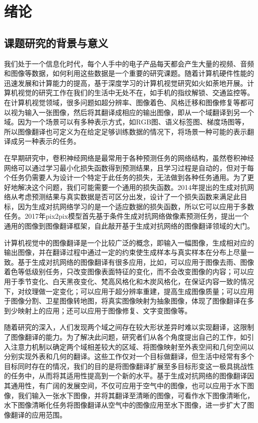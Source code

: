\chapter{绪论}

\section{课题研究的背景与意义}
我们处于一个信息化时代，每个人手中的电子产品每天都会产生大量的视频、音频和图像等数据，如何利用这些数据是一个重要的研究课题。随着计算机硬件性能的迅速发展和计算能力的提高，基于深度学习的计算机视觉研究如火如荼地开展。计算机视觉的研究工作在我们的生活中无处不在，如手机的指纹解锁、交通监控等。在计算机视觉领域，很多问题如超分辨率、图像着色、风格迁移和图像修复等都可以视为输入一张图像，然后将其翻译成相应的输出图像，即从一个域翻译到另一个域。因为一个场景可以有多种表示方式，如RGB图、语义标签图、梯度场图等，所以图像翻译也可定义为在给定足够训练数据的情况下，将场景一种可能的表示翻译成另一种表示的任务。

在早期研究中，卷积神经网络是最常用于各种预测任务的网络结构，虽然卷积神经网络可以通过学习最小化损失函数得到预测结果，且学习过程是自动的，但对于每个任务仍需要人为设计一个特定于此任务的损失，无法做到各种任务通用。为了更好地解决这个问题，我们可能需要一个通用的损失函数。2014年提出的生成对抗网络\cite{goodfellow2014generative}从考虑预测结果与真实数据是否可区分出发，设计了一个损失函数来满足此目标，因为生成对抗网络学习的是一个适应数据的损失函数，所以它可以应用于多数任务。2017年pix2pix\cite{isola2017image}模型首先基于条件生成对抗网络做像素预测任务，提出一个通用的图像到图像翻译框架，自此敲开基于生成对抗网络的图像翻译领域的大门。

计算机视觉中的图像翻译是一个比较广泛的概念，即输入一幅图像，生成相对应的输出图像，并在翻译过程中通过一定的约束使生成样本与真实样本在分布上尽量一致。基于生成对抗网络的图像翻译有很多应用，比如，可以应用于图像去雨、图像着色等低级别任务，只改变图像表面特征的变化，而不会改变图像的内容；可以应用于季节变化、白天黑夜变化、梵高风格化和木炭风格化，在保证内容一致的情况下，对纹理做一定变化；可以应用于超分辨率重建，提高生成图像质量；可以应用于图像分割、卫星图像转地图，将真实图像映射为抽象图像，体现了图像翻译在多到少映射上的应用；还可以应用于图像修复、文字变图像等。

随着研究的深入，人们发现两个域之间存在较大形状差异时难以实现翻译，这限制了图像翻译的能力。为了解决此问题，研究者们从各个角度提出自己的工作，如引入注意力机制以确定两个域相差较大的区域、将图像映射至外表空间和几何空间以分别实现外表和几何的翻译。这些工作仅对一个目标做翻译，但生活中经常有多个目标同时存在的情况，我们的目的是将图像翻译扩展至多目标形变这一极具挑战性的任务中，从而将其适用性提高到一个新的水平。基于生成对抗网络的图像翻译因其通用性，有广阔的发展空间，不仅可应用于空气中的图像，也可以应用于水下图像，我们输入一张水下图像，并将其翻译至清晰的图像，可看作水下图像清晰化，水下图像清晰化任务将图像翻译从空气中的图像应用至水下图像，进一步扩大了图像翻译的应用范围。

